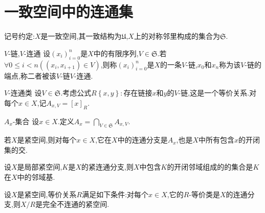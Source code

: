 \section{一致空间中的连通集}

记号约定:$X$是一致空间,其一致结构为$\mathfrak{U}$,$X$上的对称邻里构成的集合为$\mathfrak{S}$.

\begin{definition}{$V$-链,$V$-连通}{}
	设$\left(x_{i}\right)_{i=0}^{n}$是$X$中的有限序列,$V\in\mathfrak{S}$.若$\forall 0\leq i<n\left(\left(x_{i},x_{i+1}\right)\in V\right)$,则称$\left(x_{i}\right)_{i=0}^{n}$是$X$的一条$V$-链,$x_{0}$和$x_{n}$称为该$V$-链的端点,称二者被该$V$-链$V$-连通.
\end{definition}

\begin{definition}{$V$-连通类}{}
	设$V\in\mathfrak{S}$.考虑公式$R\left\{x,y\right\}:\text{存在链接}x\text{和}y\text{的}V\text{-链}$,这是一个等价关系.对每个$x\in X$,记$A_{x,V}=\left[x\right]_{R}$.
\end{definition}

\begin{definition}{$A_{x}$-集合}{}
	设$x\in X$.定义$A_{x}=\bigcap\limits_{V\in\mathfrak{S}}A_{x,V}$.
\end{definition}

\begin{proposition}{}{}
	若$X$是紧空间,则对每个$x\in X$,它在$X$中的连通分支是$A_{x}$,也是$X$中所有包含$x$的开闭集的交.
\end{proposition}

\begin{corollary}{}{}
	设$X$是局部紧空间,$K$是$X$的紧连通分支,则$X$中包含$K$的开闭邻域组成的的集合是$K$在$X$中的邻域基.
\end{corollary}

\begin{proposition}{}{}
	设$X$是紧空间,等价关系$R$满足如下条件:对每个$x\in X$,它的$R$-等价类是$X$的连通分支,则$X/R$是完全不连通的紧空间.
\end{proposition}
